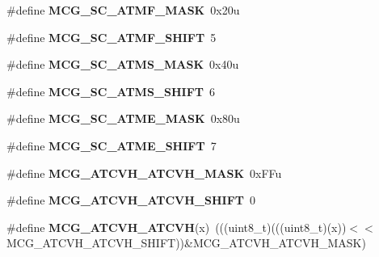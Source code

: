 \begin{DoxyCompactItemize}
\item 
\#define {\bfseries M\+C\+G\+\_\+\+S\+C\+\_\+\+A\+T\+M\+F\+\_\+\+M\+A\+SK}~0x20u\hypertarget{group__MCG__Register__Masks_ga15326687d7d214b4847a3cae6e6cdfaa}{}\label{group__MCG__Register__Masks_ga15326687d7d214b4847a3cae6e6cdfaa}

\item 
\#define {\bfseries M\+C\+G\+\_\+\+S\+C\+\_\+\+A\+T\+M\+F\+\_\+\+S\+H\+I\+FT}~5\hypertarget{group__MCG__Register__Masks_gac7fd1ff91fc1de6800a18f875398d966}{}\label{group__MCG__Register__Masks_gac7fd1ff91fc1de6800a18f875398d966}

\item 
\#define {\bfseries M\+C\+G\+\_\+\+S\+C\+\_\+\+A\+T\+M\+S\+\_\+\+M\+A\+SK}~0x40u\hypertarget{group__MCG__Register__Masks_gaf5a12b51cc62a0ce10f3fbecdebd0222}{}\label{group__MCG__Register__Masks_gaf5a12b51cc62a0ce10f3fbecdebd0222}

\item 
\#define {\bfseries M\+C\+G\+\_\+\+S\+C\+\_\+\+A\+T\+M\+S\+\_\+\+S\+H\+I\+FT}~6\hypertarget{group__MCG__Register__Masks_ga9a8ce406d5868276e9c3b37190ab89b1}{}\label{group__MCG__Register__Masks_ga9a8ce406d5868276e9c3b37190ab89b1}

\item 
\#define {\bfseries M\+C\+G\+\_\+\+S\+C\+\_\+\+A\+T\+M\+E\+\_\+\+M\+A\+SK}~0x80u\hypertarget{group__MCG__Register__Masks_gaf9545e815c86bd04d8513af024cb8617}{}\label{group__MCG__Register__Masks_gaf9545e815c86bd04d8513af024cb8617}

\item 
\#define {\bfseries M\+C\+G\+\_\+\+S\+C\+\_\+\+A\+T\+M\+E\+\_\+\+S\+H\+I\+FT}~7\hypertarget{group__MCG__Register__Masks_ga146594251d4266d02fecc44c1f0dd6ae}{}\label{group__MCG__Register__Masks_ga146594251d4266d02fecc44c1f0dd6ae}

\item 
\#define {\bfseries M\+C\+G\+\_\+\+A\+T\+C\+V\+H\+\_\+\+A\+T\+C\+V\+H\+\_\+\+M\+A\+SK}~0x\+F\+Fu\hypertarget{group__MCG__Register__Masks_gaf989f84acb1a8c91c7c98c2255651b00}{}\label{group__MCG__Register__Masks_gaf989f84acb1a8c91c7c98c2255651b00}

\item 
\#define {\bfseries M\+C\+G\+\_\+\+A\+T\+C\+V\+H\+\_\+\+A\+T\+C\+V\+H\+\_\+\+S\+H\+I\+FT}~0\hypertarget{group__MCG__Register__Masks_ga0fec2d450a98ab78dc7a2e4e9e33dbc6}{}\label{group__MCG__Register__Masks_ga0fec2d450a98ab78dc7a2e4e9e33dbc6}

\item 
\#define {\bfseries M\+C\+G\+\_\+\+A\+T\+C\+V\+H\+\_\+\+A\+T\+C\+VH}(x)~(((uint8\+\_\+t)(((uint8\+\_\+t)(x))$<$$<$M\+C\+G\+\_\+\+A\+T\+C\+V\+H\+\_\+\+A\+T\+C\+V\+H\+\_\+\+S\+H\+I\+FT))\&M\+C\+G\+\_\+\+A\+T\+C\+V\+H\+\_\+\+A\+T\+C\+V\+H\+\_\+\+M\+A\+SK)\hypertarget{group__MCG__Register__Masks_gab382a7e152cca964b5cd64708384c608}{}\label{group__MCG__Register__Masks_gab382a7e152cca964b5cd64708384c608}


\end{DoxyCompactItemize}
